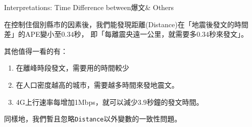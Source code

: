 \begin{frame}[fragile]{Interpretations: Time Difference between爆文\& Others}

在控制住個別縣市的因素後，我們能發現距離(Distance)在「地震後發文的時間差」的APE變小至$0.34$秒，
即「每離震央遠一公里，就需要多$0.34$秒來發文」。

其他值得一看的有：

\begin{enumerate}
    \item 在離峰時段發文，需要用的時間較少
    \item 在人口密度越高的城市，需要越多時間來發地震文。
    \item 4G上行速率每增加1Mbps，就可以減少$3.9$秒鐘的發文時間。
\end{enumerate}

同樣地，我們暫且忽略\texttt{Distance}以外變數的一致性問題。

\end{frame}




